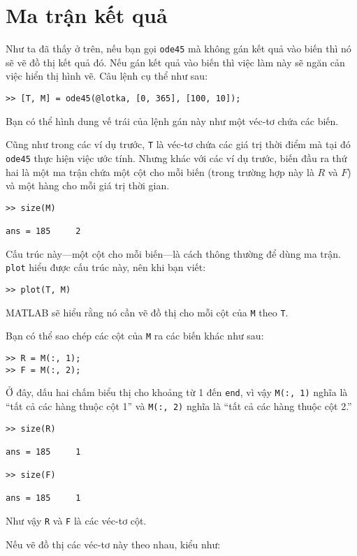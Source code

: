 \documentclass[12pt]{book}
\begin{document}
\section{Ma trận kết quả}

Như ta đã thấy ở trên, nếu bạn gọi {\tt ode45} mà không gán kết quả
vào biến thì nó sẽ vẽ đồ thị kết quả đó. Nếu gán kết quả vào biến
thì việc làm này sẽ ngăn cản việc hiển thị hình vẽ. Câu lệnh cụ thể
như sau:

\begin{verbatim}
>> [T, M] = ode45(@lotka, [0, 365], [100, 10]);
\end{verbatim}
%
Bạn có thể hình dung vế trái của lệnh gán này như một véc-tơ chứa
các biến.

Cũng như trong các ví dụ trước, {\tt T} là véc-tơ chứa các giá trị 
thời điểm mà tại đó {\tt ode45} thực hiện việc ước tính. Nhưng khác
với các ví dụ trước, biến đầu ra thứ hai là một ma trận chứa một cột
cho mỗi biến (trong trường hợp này là $R$ và $F$) và một hàng
cho mỗi giá trị thời gian.

\begin{verbatim}
>> size(M)

ans = 185     2
\end{verbatim}
%
Cấu trúc này---một cột cho mỗi biến---là cách thông thường để
dùng ma trận. {\tt plot} hiểu được cấu trúc này, nên khi bạn viết:

\begin{verbatim}
>> plot(T, M)
\end{verbatim}
%
MATLAB sẽ hiểu rằng nó cần vẽ đồ thị cho mỗi cột của {\tt M}
theo {\tt T}.

Bạn có thể sao chép các cột của {\tt M} ra các biến khác như sau:

\begin{verbatim}
>> R = M(:, 1);
>> F = M(:, 2);
\end{verbatim}
%
Ở đây, dấu hai chấm biểu thị cho khoảng từ 1 đến {\tt end},
vì vậy {\tt M(:, 1)} nghĩa là ``tất cả các hàng thuộc cột 1'' và
{\tt M(:, 2)} nghĩa là ``tất cả các hàng thuộc cột 2.''

\begin{verbatim}
>> size(R)

ans = 185     1

>> size(F)

ans = 185     1
\end{verbatim}
%
Như vậy {\tt R} và {\tt F} là các véc-tơ cột.

Nếu vẽ đồ thị các véc-tơ này theo nhau, kiểu như:
\end{document}
